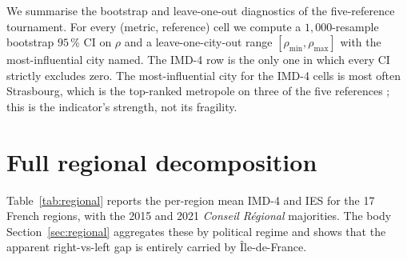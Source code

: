 \documentclass[11pt,a4paper]{article}
\begin{document}
We summarise the bootstrap and leave-one-out diagnostics of the
five-reference tournament.  For every (metric, reference) cell we
compute a $1{,}000$-resample bootstrap $95\,\%$ CI on $\rho$ and a
leave-one-city-out range $[\rho_{\min}, \rho_{\max}]$ with the
most-influential city named.  The IMD-4 row is the only one in
which every CI strictly excludes zero.  The most-influential
city for the IMD-4 cells is most often Strasbourg, which is the
top-ranked metropole on three of the five references ; this is
the indicator's strength, not its fragility.

\section{Full regional decomposition}
\label{app:regional-full}

Table~\ref{tab:regional} reports the per-region mean IMD-4 and IES
for the 17 French regions, with the 2015 and 2021 \emph{Conseil
R\'egional} majorities.  The body Section~\ref{sec:regional}
aggregates these by political regime and shows that the apparent
right-vs-left gap is entirely carried by \^Ile-de-France.
\end{document}
